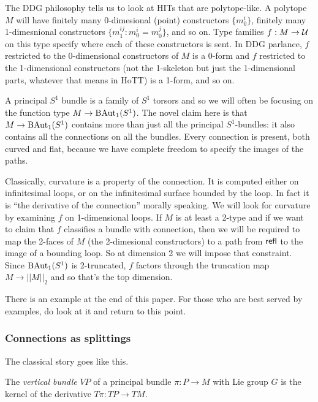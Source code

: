 The DDG philosophy tells us to look at HITs that are polytope-like. A polytope \( M \) will have finitely many 0-dimesional (point) constructors \( \{m_0^i\} \), finitely many 1-dimesnional constructors \( \{m_1^{ij}:m_0^i=m_0^j\} \), and so on. Type families \( f:M\to \mathcal{U} \) on this type specify where each of these constructors is sent. In DDG parlance, \( f \) restricted to the 0-dimensional constructors of \( M \) is a 0-form and \( f \) restricted to the 1-dimensional constructors (not the 1-skeleton but just the 1-dimensional parts, whatever that means in HoTT) is a 1-form, and so on.

A principal \( S^1 \) bundle is a family of \( S^1 \) torsors and so we will often be focusing on the function type \( M\to \mathrm{BAut}_1(S^1) \). The novel claim here is that \( M\to \mathrm{BAut}_1(S^1) \) contains more than just all the principal \( S^1 \)-bundles: it also contains all the connections on all the bundles. Every connection is present, both curved and flat, because we have complete freedom to specify the images of the paths.

Classically, curvature is a property of the connection. It is computed either on infinitesimal loops, or on the infinitesimal surface bounded by the loop. In fact it is ``the derivative of the connection'' morally speaking. We will look for curvature by examining \( f \) on 1-dimensional loops. If \( M \) is at least a 2-type and if we want to claim that \( f \) classifies a bundle with connection, then we will be required to map the 2-faces of \( M \) (the 2-dimesional constructors) to a path from \( \mathsf{refl} \) to the image of a bounding loop. So at dimension 2 we will impose that constraint. Since \( \mathrm{BAut}_1(S^1) \) is 2-truncated, \( f \) factors through the truncation map \( M\to||M||_2 \) and so that's the top dimension.

There is an example at the end of this paper. For those who are best served by examples, do look at it and return to this point.

\subsubsection{Connections as splittings}

The classical story goes like this.

\begin{mydef}
The \emph{vertical bundle} \( VP \) of a principal bundle \( \pi:P\to M \) with Lie group \( G \) is the kernel of the derivative \( T\pi:TP\to TM \). 
\end{mydef}

